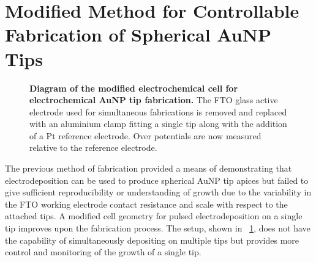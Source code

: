 \documentclass{article}
\begin{document}
\section{Modified Method for Controllable Fabrication of Spherical AuNP Tips}

\begin{figure}
\vspace{-10pt}
\centering
\begin{singlespace}
\fontsize{10pt}{1em}\selectfont {new_setup.pdf_tex}
\end{singlespace}
\caption[Diagram of the modified method for electrochemical AuNP tip fabrication.]{\textbf{Diagram of the modified electrochemical cell for electrochemical AuNP tip fabrication.} The FTO glass active electrode used for simultaneous fabrications is removed and replaced with an aluminium clamp fitting a single tip along with the addition of a Pt reference electrode. Over potentials are now measured relative to the reference electrode.}
\label{fig:new_method}
\end{figure}

The previous method of fabrication provided a means of demonstrating that electrodeposition can be used to produce spherical AuNP tip apices but failed to give sufficient reproducibility or understanding of growth due to the variability in the FTO working electrode contact resistance and scale with respect to the attached tips. A modified cell geometry for pulsed electrodeposition on a single tip improves upon the fabrication process. The setup, shown in \figurename~\ref{fig:new_method}, does not have the capability of simultaneously depositing on multiple tips but provides more control and monitoring of the growth of a single tip.
\end{document}
